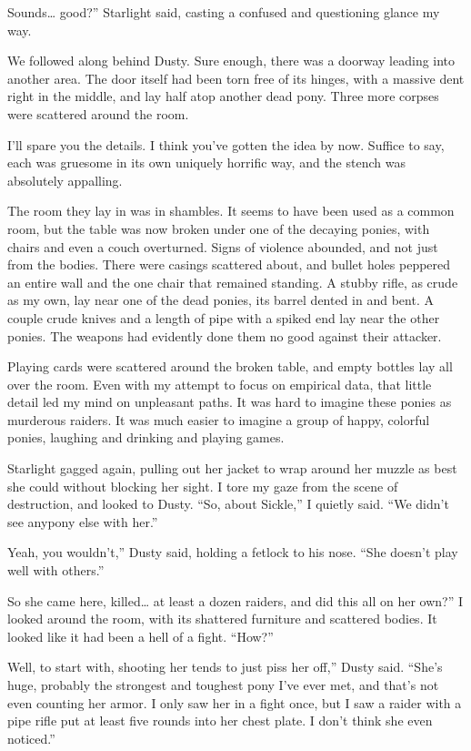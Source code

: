 \leavevmode{}Sounds… good?” Starlight said, casting a confused and questioning glance my way.

We followed along behind Dusty. Sure enough, there was a doorway leading into another area. The door itself had been torn free of its hinges, with a massive dent right in the middle, and lay half atop another dead pony. Three more corpses were scattered around the room.

I’ll spare you the details. I think you’ve gotten the idea by now. Suffice to say, each was gruesome in its own uniquely horrific way, and the stench was absolutely appalling.

The room they lay in was in shambles. It seems to have been used as a common room, but the table was now broken under one of the decaying ponies, with chairs and even a couch overturned. Signs of violence abounded, and not just from the bodies. There were casings scattered about, and bullet holes peppered an entire wall and the one chair that remained standing. A stubby rifle, as crude as my own, lay near one of the dead ponies, its barrel dented in and bent. A couple crude knives and a length of pipe with a spiked end lay near the other ponies. The weapons had evidently done them no good against their attacker.

Playing cards were scattered around the broken table, and empty bottles lay all over the room. Even with my attempt to focus on empirical data, that little detail led my mind on unpleasant paths. It was hard to imagine these ponies as murderous raiders. It was much easier to imagine a group of happy, colorful ponies, laughing and drinking and playing games.

Starlight gagged again, pulling out her jacket to wrap around her muzzle as best she could without blocking her sight. I tore my gaze from the scene of destruction, and looked to Dusty. “So, about Sickle,” I quietly said. “We didn’t see anypony else with her.”

\leavevmode{}Yeah, you wouldn’t,” Dusty said, holding a fetlock to his nose. “She doesn’t play well with others.”

\leavevmode{}So she came here, killed… at least a dozen raiders, and did this all on her own?” I looked around the room, with its shattered furniture and scattered bodies. It looked like it had been a hell of a fight. “How?”

\leavevmode{}Well, to start with, shooting her tends to just piss her off,” Dusty said. “She’s huge, probably the strongest and toughest pony I’ve ever met, and that’s not even counting her armor. I only saw her in a fight once, but I saw a raider with a pipe rifle put at least five rounds into her chest plate. I don’t think she even noticed.”

